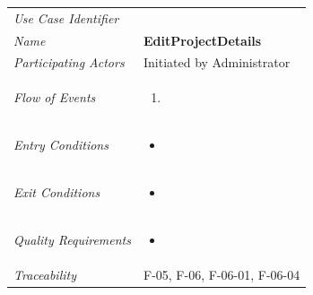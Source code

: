 \documentclass[12pt,letterpaper]{article}
\begin{document}
\begin{center}
	\begin{tabu} to 
		\toprule
		Use Case Identifier & \editprojectdetails{} \\
		Name & {\bf EditProjectDetails} \\
		Participating Actors & Initiated by Administrator \\
		Flow of Events & 
	    \begin{enumerate}[topsep=-1em,leftmargin=*]
		    \item 
		\end{enumerate} \\

		Entry Conditions &
		\begin{itemize}[topsep=-1em,leftmargin=*]
		    \item 
        \end{itemize} \\

		Exit Conditions &
		\begin{itemize}[topsep=-1em,leftmargin=*]
		    \item 
        \end{itemize} \\

		Quality Requirements &
		\begin{itemize}[topsep=-1em,leftmargin=*]
		    \item 
        \end{itemize} \\

		Traceability & F-05, F-06, F-06-01, F-06-04 \\
		\toprule
	\end{tabu}
\end{center}
\end{document}
